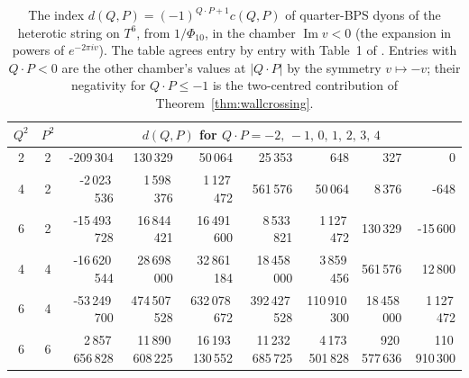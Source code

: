 \begin{table}[t]
\centering\small
\setlength{\tabcolsep}{5pt}
\begin{tabular}{@{}cc*{7}{r}@{}}
\toprule
$Q^2$ & $P^2$ & \multicolumn{7}{c}{$d(Q,P)$ for $Q\cdot P = -2,\,-1,\,0,\,1,\,2,\,3,\,4$}\\
\midrule
2 & 2 & -209\,304 & 130\,329 & 50\,064 & 25\,353 & 648 & 327 & 0 \\
4 & 2 & -2\,023\,536 & 1\,598\,376 & 1\,127\,472 & 561\,576 & 50\,064 & 8\,376 & -648 \\
6 & 2 & -15\,493\,728 & 16\,844\,421 & 16\,491\,600 & 8\,533\,821 & 1\,127\,472 & 130\,329 & -15\,600 \\
4 & 4 & -16\,620\,544 & 28\,698\,000 & 32\,861\,184 & 18\,458\,000 & 3\,859\,456 & 561\,576 & 12\,800 \\
6 & 4 & -53\,249\,700 & 474\,507\,528 & 632\,078\,672 & 392\,427\,528 & 110\,910\,300 & 18\,458\,000 & 1\,127\,472 \\
6 & 6 & 2\,857\,656\,828 & 11\,890\,608\,225 & 16\,193\,130\,552 & 11\,232\,685\,725 & 4\,173\,501\,828 & 920\,577\,636 & 110\,910\,300 \\
\bottomrule
\end{tabular}
\caption{The index $d(Q,P) = (-1)^{Q\cdot P+1}c(Q,P)$ of quarter-BPS dyons of the heterotic string on $T^6$, from $1/\Phi_{10}$, in the chamber $\operatorname{Im} v<0$ (the expansion in powers of $e^{-2\pi i v}$). The table agrees entry by entry with Table~1 of \cite{Sen11positivity}. Entries with $Q\cdot P<0$ are the other chamber's values at $|Q\cdot P|$ by the symmetry $v\mapsto -v$; their negativity for $Q\cdot P\le -1$ is the two-centred contribution of Theorem~\ref{thm:wallcrossing}.}
\label{tab:phi10}
\end{table}
